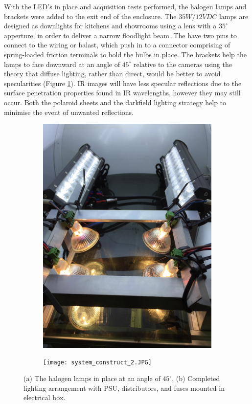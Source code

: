 \documentclass[fleqn,twoside]{article}
\begin{document}
With the LED's in place and acquisition tests performed, the halogen lamps and brackets were added to the exit end of the enclosure. The $35W/12VDC$ lamps are designed as downlights for kitchens and showrooms using a lens with a $35^{\circ}$ apperture, in order to deliver a narrow floodlight beam. The have two pins to connect to the wiring or balast, which push in to a connector comprising of spring-loaded friction terminals to hold the bulbs in place. The brackets help the lamps to face downward at an angle of $45^{\circ}$ relative to the cameras using the theory that diffuse lighting, rather than direct, would be better to avoid specularities (Figure \ref{fig:halogen}). IR images will have less specular reflections due to the surface penetration properties found in IR wavelengths, however they may still occur. Both the polaroid sheets and the darkfield lighting strategy help to minimise the event of unwanted reflections.

\begin{figure}[ht]
	\centering
	\begin{subfigure}{.5\textwidth}
		\centering
		\includegraphics[width=.8\linewidth, angle=270]{halogen.jpg}
		\caption{}
		\label{fig:halogen}
	\end{subfigure}%
	\begin{subfigure}{.5\textwidth}
		\centering
		\texttt{[image: system\_construct\_2.JPG]}
		\caption{}
		\label{fig:lights_power}
	\end{subfigure}%

	\caption{(a) The halogen lamps in place at an angle of $45^{\circ}$, (b) Completed lighting arrangement with PSU, distributors, and fuses mounted in electrical box.}
	\label{}
\end{figure}
\end{document}
